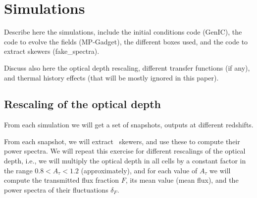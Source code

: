 \section{Simulations}
\label{sec:sims}

Describe here the simulations, include the initial conditions code (GenIC), 
the code to evolve the fields (MP-Gadget), the different boxes used, 
and the code to extract skewers (fake\_spectra).

Discuss also here the optical depth rescaling, different transfer functions
(if any), and thermal history effects (that will be mostly ignored in this
paper).


\subsection{Rescaling of the optical depth}

From each simulation we will get a set of snapshots, outputs at different 
redshifts. 

From each snapshot, we will extract \lya\ skewers, and use these to compute 
their power spectra. 
We will repeat this exercise for different rescalings of the optical depth, 
i.e., we will multiply the optical depth in all cells by a constant factor
in the range $0.8 < A_\tau < 1.2$ (approximately), and for each value of 
$A_\tau$ we will compute the transmitted flux fraction $F$, its mean value
(mean flux), and the power spectra of their fluctuations $\delta_F$. 

